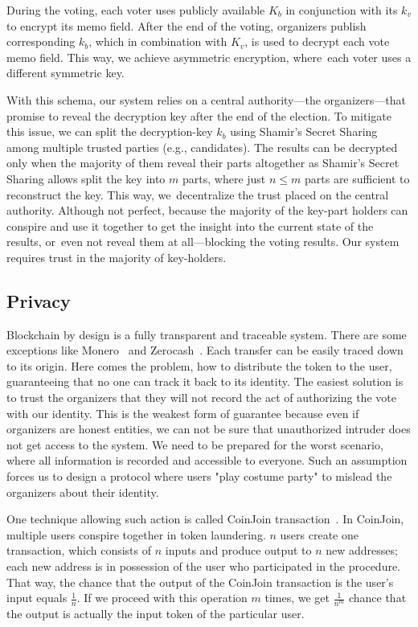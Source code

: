 \documentclass[applsci,article,accept,moreauthors,pdftex]{Definitions/mdpi}
\begin{document}
During the voting, each voter uses publicly available $K_b$ in conjunction with its $k_v$ to encrypt its memo field. After the end of the voting, organizers publish corresponding $k_b$, which in combination with $K_v$, is used to decrypt each vote memo field. This way, we achieve asymmetric encryption, where~each voter uses a different symmetric key.

With this schema, our system relies on a central authority––the organizers––that promise to reveal the decryption key after the end of the election. To mitigate this issue, we can split the decryption-key $k_b$ using Shamir's Secret Sharing~\cite{shamir1979share} among multiple trusted parties (e.g., candidates). The results can be decrypted only when the majority of them reveal their parts altogether
as Shamir's Secret Sharing allows split the key into $m$ parts, where just $n \leq m$ parts are sufficient to reconstruct the key.
This way, we~decentralize the trust placed on the central authority. Although not perfect, because the majority of the key-part holders can conspire and use it together to get the insight into the current state of the results, or~even not reveal them at all––blocking the voting results. Our system requires trust in the majority of key-holders.

\subsection{Privacy}
\label{privacy}
Blockchain by design is a fully transparent and traceable system.
There are some exceptions like Monero~\cite{van2013cryptonote} and Zerocash~\cite{sasson2014zerocash}. %
Each transfer can be easily traced down to its origin. Here comes the problem, how to distribute the token to the user, guaranteeing that no one can track it back to its identity. The easiest solution is to trust the organizers that they will not record the act of authorizing the vote with our identity. This is the weakest form of guarantee because even if organizers are honest entities, we can not be sure that unauthorized intruder does not get access to the system. We need to be prepared for the worst scenario, where all information is recorded and accessible to everyone. Such an assumption forces us to design a protocol where users "play costume party" to mislead the organizers about their identity. 

One technique allowing such action is called CoinJoin transaction~\cite{CoinJoin41:online}. In CoinJoin, multiple users conspire together in token laundering. $n$ users create one transaction, which consists of $n$ inputs and produce output to $n$ new addresses; each new address is in possession of the user who participated in the procedure. That way, the chance that the output of the CoinJoin transaction is the user's input equals $\frac{1}{n}$. If we proceed with this operation $m$ times, we get $\frac{1}{n^m}$ chance that the output is actually the input token of the particular user. 
\end{document}
